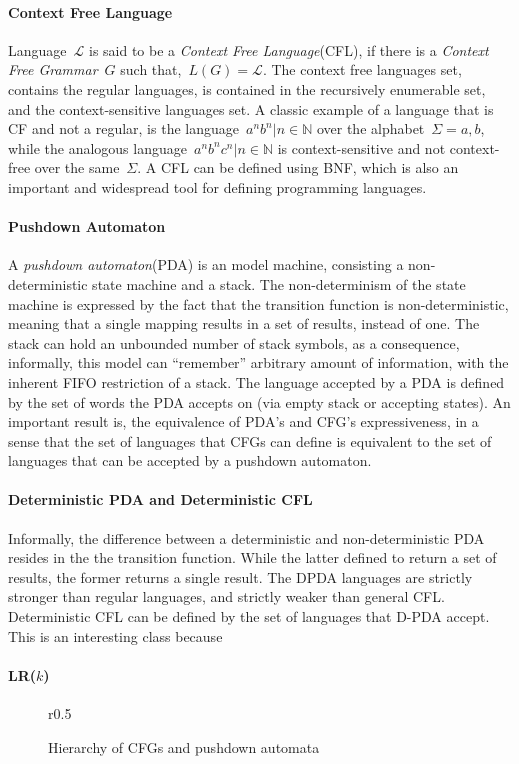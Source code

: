 \paragraph{Context Free Language}
Language~$\mathcal{L}$ is said to be a \emph{Context Free Language}(CFL), if there
  is a \emph{Context Free Grammar}~$G$ such that,~$L(G)=\mathcal{L}$.
The context free languages set, contains the regular languages, 
  is contained in the recursively enumerable set, and the context-sensitive languages set.
A classic example of a language that is CF and not a regular, 
  is the language~${a^nb^n|n\in\mathbb{N}}$ over the alphabet~$\Sigma={a,b}$,
  while the analogous language~${a^nb^nc^n|n\in\mathbb{N}}$ is context-sensitive 
  and not context-free over the same~$\Sigma$.
A CFL can be defined using BNF, which is also an important and widespread tool for 
  defining programming languages.
\paragraph{Pushdown Automaton}
A \emph{pushdown automaton}(PDA) is an model machine, consisting a non-deterministic state machine
  and a stack. 
The non-determinism of the state machine is expressed by the fact that the transition function
  is non-deterministic, meaning that a single mapping results in a set of results, instead of one.
The stack can hold an unbounded number of stack symbols, as a consequence, informally, 
  this model can ``remember'' arbitrary amount of information, with the inherent FIFO restriction 
  of a stack.
The language accepted by a PDA is defined by the set of words the PDA accepts on 
  (via empty stack or accepting states).
An important result is, the equivalence of PDA's and CFG's expressiveness, in a sense that
  the set of languages that CFGs can define is equivalent to the set of languages that can be
  accepted by a pushdown automaton.
\paragraph{Deterministic PDA and Deterministic CFL}
Informally, the difference between a deterministic and non-deterministic PDA resides in the
  the transition function. 
While the latter defined to return a set of results, the former returns a single result.
The DPDA languages are strictly stronger than regular languages, and strictly weaker than
  general CFL.
Deterministic CFL can be defined by the set of languages that D-PDA accept.
This is an interesting class because 
\paragraph{LR($k$)}
\begin{wrapfigure}r{0.5\linewidth}
  \caption{Hierarchy of CFGs and pushdown automata}
  
\end{wrapfigure}

